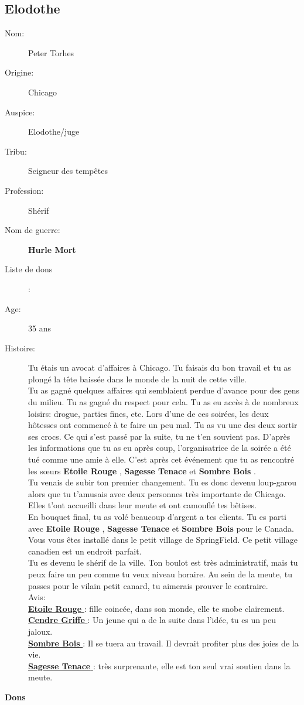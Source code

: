 \documentclass[oneside,12pt]{book}
\newcommand{\Lynn}{\textbf{Etoile Rouge} }
\newcommand{\Jessica}{\textbf{Sagesse Tenace} }
\newcommand{\Luke}{\textbf{Cendre Griffe} }
\newcommand{\Peter}{\textbf{Hurle Mort} }
\newcommand{\Leonard}{\textbf{Sombre Bois} }
\begin{document}
\begin{flushleft}
\section{Elodothe}
\begin{description}
\item[Nom:]{Peter Torhes}
\item[Origine:]{Chicago}
\item[Auspice:]{Elodothe/juge}
\item[Tribu:]{Seigneur des tempêtes}
\item[Profession:]{Shérif}
\item[Nom de guerre:]{\Peter}
\item[Liste de dons]:
\item[Age:]{35 ans}
\item[Histoire:]{
Tu étais un avocat d'affaires à Chicago. 
Tu faisais du bon travail et tu as plongé la tête baissée dans le monde de la nuit de cette ville.\\
Tu as gagné quelques affaires qui semblaient perdue d'avance pour des gens du milieu.
Tu as gagné du respect pour cela. Tu as eu accès à de nombreux loisirs: drogue, parties fines, etc. Lors d'une de ces soirées, les deux hôtesses ont commencé à te faire un peu mal. Tu as vu une des deux sortir ses crocs. Ce qui s'est passé par la suite, tu ne t'en souvient pas.  
D'après les informations que tu as eu après coup, l'organisatrice de la soirée a été tué comme une amie à elle. 
C'est après cet événement que tu as rencontré les sœurs \Lynn , \Jessica et \Leonard.\\
Tu venais de subir ton premier changement. Tu es donc devenu loup-garou alors que tu t'amusais avec deux personnes très importante de Chicago.
Elles t'ont accueilli dans leur meute et ont camouflé tes bêtises. \\
En bouquet final, tu as volé beaucoup d'argent a tes clients. 
Tu es parti avec \Lynn, \Jessica et \Leonard pour le Canada. Vous vous êtes installé dans le petit village de SpringField. Ce petit village canadien est un endroit parfait. \\
Tu es devenu le shérif de la ville. Ton boulot est très administratif, mais tu peux faire un peu comme tu veux niveau horaire. 
Au sein de la meute, tu passes pour le vilain petit canard, tu aimerais prouver le contraire. \\

Avis:\\
\underline{\Lynn} : fille coincée, dans son monde, elle te snobe clairement.\\
\underline{\Luke} : Un jeune qui a de la suite dans l'idée, tu es un peu jaloux.\\
\underline{\Leonard} : Il se tuera au travail. Il devrait profiter plus des joies de la vie.\\
\underline{\Jessica} : très surprenante, elle est ton seul vrai soutien dans la meute. \\
}
\end{description}
\clearpage
\textbf{\large Dons} 
\vspace{0.5cm}


\end{flushleft}
\end{document}
